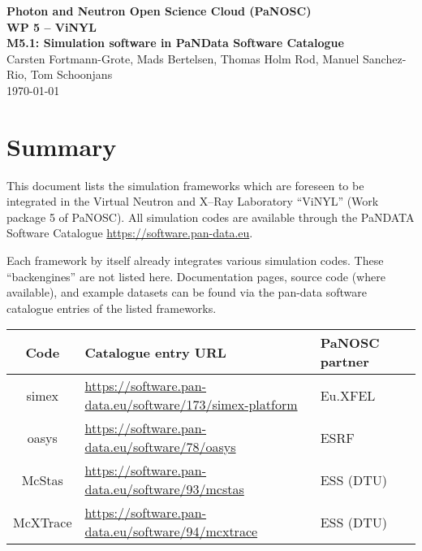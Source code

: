 \documentclass[10pt]{scrartcl}
\begin{document}
\makeatletter
\begin{titlepage}
\thispagestyle{scrheadings}
\begin{center}
  $~$\\
  \vspace{2cm}
  \Huge{%
    \textbf{%
      Photon and Neutron Open Science Cloud (PaNOSC) \\[1cm]
      WP 5 -- ViNYL\\[1cm]
      M5.1: Simulation software in PaNData Software Catalogue
    }
  }\\
  \vspace{2cm}
  \large{%
    Carsten Fortmann-Grote,
    Mads Bertelsen,
    Thomas Holm Rod,
    Manuel Sanchez-Rio,
    Tom Schoonjans
  }\\
  \today
\end{center}
\vfill%
\end{titlepage}
\makeatother


\section{Summary}

This document lists the simulation frameworks which are foreseen to be integrated in
the Virtual Neutron and X--Ray Laboratory ``ViNYL'' (Work package 5 of PaNOSC).
All simulation codes are available through the PaNDATA Software Catalogue
\url{https://software.pan-data.eu}.

Each framework by itself already integrates various simulation codes. These
``backengines'' are not listed here. Documentation pages, source code (where
available), and example datasets can be found via the pan-data software
catalogue entries of the listed frameworks.\\[5ex]
\begin{tabular}{|c|l|l|l|}
  \hline
  \textbf{Code} & \textbf{Catalogue entry URL} & \textbf{PaNOSC partner} \\
  \hline
  simex & \url{https://software.pan-data.eu/software/173/simex-platform} & Eu.XFEL \\
  oasys & \url{https://software.pan-data.eu/software/78/oasys} & ESRF \\
  McStas & \url{https://software.pan-data.eu/software/93/mcstas} & ESS (DTU) \\
  McXTrace & \url{https://software.pan-data.eu/software/94/mcxtrace} & ESS (DTU) \\
  \hline
\end{tabular}
\end{document}
